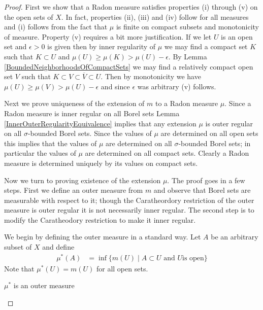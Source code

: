 \begin{proof}
First we show that a Radon measure satisfies properties (i) through
(v) on the open sets of $X$.  In fact, properties (ii), (iii) and (iv)
follow for all measures and (i) follows from the fact that $\mu$ is
finite on compact subsets and monotonicity of measure.  Property (v)
requires a bit more justification.  If we let $U$ is an open set and
$\epsilon > 0$ is given then by inner regularity of $\mu$ we may find
a compact set $K$ such that $K \subset U$ and $\mu(U) \geq \mu(K) > \mu(U) -
\epsilon$.  By Lemma \ref{BoundedNeighborhoodsOfCompactSets} we may
find a relatively compact open set $V$ such that $K \subset V \subset
\overline{V} \subset U$.  Then by monotonicity we have $\mu(U) \geq \mu(V) > \mu(U) -
\epsilon$ and since $\epsilon$ was arbitrary (v) follows.

Next we prove uniqueness of the extension of $m$ to a Radon measure
$\mu$.  Since a Radon measure is inner regular on all Borel sets Lemma
\ref{InnerOuterRegularityEquivalence} implies that any extension $\mu$
is outer regular on all $\sigma$-bounded Borel sets.  Since the values
of $\mu$ are determined on all open sets this implies that the values
of $\mu$ are determined on all $\sigma$-bounded Borel sets; in
particular the values of $\mu$ are determined on all compact
sets. Clearly a Radon measure is determined uniquely by its values on
compact sets.

Now we turn to proving existence of the extension $\mu$.  The proof
goes in a few steps.  First we define an outer measure from $m$ and
observe that Borel sets are measurable with respect to it; though the
Caratheordory restriction of the outer
measure is outer regular it is not necessarily inner regular.  The
second step is to 
modify the Caratheodory restriction to make it inner regular.  

We begin by defining the outer measure in a standard way.  Let $A$ be
an arbitrary subset of $X$ and define
\begin{align*}
\mu^*(A) &= \inf \lbrace m(U) \mid A \subset U \text{ and $U$
  is open} \rbrace
\end{align*}
Note that $\mu^*(U) = m(U)$ for all open sets.

\begin{clm}$\mu^*$ is an outer measure
\end{clm}


\end{proof}
